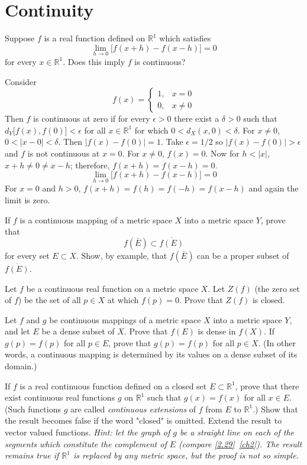 \chapter{Continuity}
\label{ch4}

\begin{exercise}
\item
  Suppose \(f\) is a real function defined on \(\mathbb{R}^1\) which satisfies
  \[
  \lim_{h\to 0}\bigl[f(x + h) - f(x - h)\bigr] = 0
  \]
  for every \(x\in\mathbb{R}^1\).
  Does this imply \(f\) is continuous?
  \par\smallskip
  Consider
  \[
  f(x) =
  \begin{cases}
    1, & x = 0\\
    0, & x\neq 0
  \end{cases}
  \]
  Then \(f\) is continuous at zero if for every \(\epsilon > 0\) there exist a
  \(\delta > 0\) such that \(d_Y\bigl[f(x),f(0)\bigr] < \epsilon\) for all
  \(x\in\mathbb{R}^1\) for which \(0 < d_X(x,0) < \delta\).
  For \(x\neq 0\), \(0 < \lvert x - 0\rvert < \delta\).
  Then \(\lvert f(x) - f(0)\rvert = 1\).
  Take \(\epsilon = 1/2\) so \(\lvert f(x) - f(0)\rvert > \epsilon\) and \(f\)
  is not continuous at \(x = 0\).
  For \(x\neq 0\), \(f(x) = 0\).
  Now for \(h < \lvert x\rvert\), \(x + h\neq 0\neq x - h\); therefore,
  \(f(x + h) = f(x - h) = 0\).
  \[
  \lim_{h\to 0}\bigl[f(x + h) - f(x - h)\bigr] = 0
  \]
  For \(x = 0\) and \(h > 0\), \(f(x + h) = f(h) = f(-h) = f(x - h)\) and again
  the limit is zero.
\item
  If \(f\) is a continuous mapping of a metric space \(X\) into a metric space
  \(Y\), prove that
  \[
  f(\bar{E})\subset\overline{f(E)}
  \]
  for every set \(E\subset X\).
  Show, by example, that \(f(\bar{E})\) can be a proper subset of
  \(\overline{f(E)}\).
\item
  Let \(f\) be a continuous real function on a metric space \(X\).
  Let \(Z(f)\) (the zero set of \(f\)) be the set of all \(p\in X\) at which
  \(f(p) = 0\).
  Prove that \(Z(f)\) is closed.
\item
  Let \(f\) and \(g\) be continuous mappings of a metric space \(X\) into a
  metric space \(Y\), and let \(E\) be a dense subset of \(X\).
  Prove that \(f(E)\) is dense in \(f(X)\).
  If \(g(p) = f(p)\) for all \(p\in E\), prove that \(g(p) = f(p)\) for all
  \(p\in X\).
  (In other words, a continuous mapping is determined by its values on a dense
  subset of its domain.)
\item
  If \(f\) is a real continuous function defined on a closed set
  \(E\subset\mathbb{R}^1\), prove that there exist continuous real functions
  \(g\) on \(\mathbb{R}^1\) such that \(g(x) = f(x)\) for all \(x\in E\).
  (Such functions \(g\) are called \textit{continuous extensions} of \(f\) from
  \(E\) to \(\mathbb{R}^1\).)
  Show that the result becomes false if the word "closed" is omitted.
  Extend the result to vector valued functions.
  \textit{Hint: let the graph of \(g\) be a straight line on each of the
    segments which constitute the complement of \(E\) (compare
    \cref{2.29}~\cref{ch2}).
    The result remains true if \(\mathbb{R}^1\) is replaced by any metric
    space, but the proof is not so simple.}
\end{exercise}

